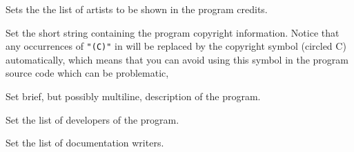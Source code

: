 


\label{wxaboutdialoginfosetartists}


Sets the the list of artists to be shown in the program credits.




\label{wxaboutdialoginfosetcopyright}


Set the short string containing the program copyright information. Notice that
any occurrences of \texttt{"(C)"} in  will be replaced by the
copyright symbol (circled C) automatically, which means that you can avoid
using this symbol in the program source code which can be problematic,


\label{wxaboutdialoginfosetdescription}


Set brief, but possibly multiline, description of the program.


\label{wxaboutdialoginfosetdevelopers}


Set the list of developers of the program.




\label{wxaboutdialoginfosetdocwriters}


Set the list of documentation writers.




\label{wxaboutdialoginfoseticon}

